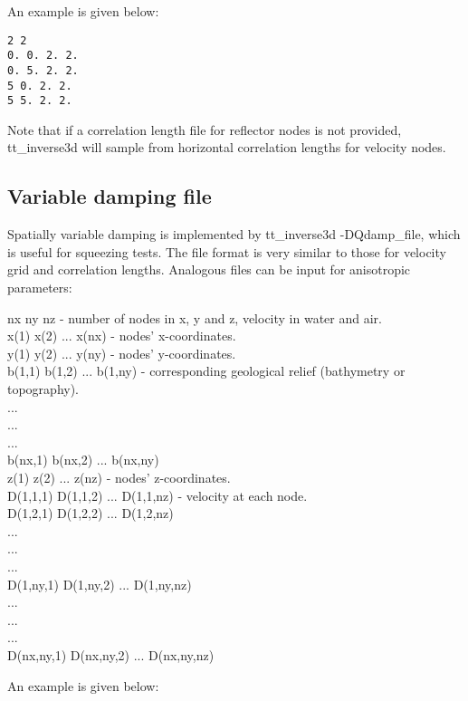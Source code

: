 \documentclass[twoside,final,onecolumn]{article}
\begin{document}
An example is given below:
\begin{verbatim}
2 2
0. 0. 2. 2.
0. 5. 2. 2.
5 0. 2. 2.
5 5. 2. 2.
\end{verbatim}

Note that if a correlation length file for reflector nodes is not provided, tt\_inverse3d will sample from horizontal correlation lengths for velocity nodes.

\subsection{Variable damping file}
Spatially variable damping is implemented by tt\_inverse3d -DQdamp\_file, which is useful for squeezing tests.
The file format is very similar to those for velocity grid and correlation lengths. Analogous files can be input for anisotropic parameters:\\
\begin{framed}
\noindent nx ny nz \qquad\qquad\hphantom{vwater vair}- number of nodes in x, y and z, velocity in water and air.\\
x(1) x(2) ... x(nx) \qquad\qquad\hphantom{no}- nodes' x-coordinates.\\
y(1) y(2) ... y(ny) \qquad\qquad\hphantom{no}- nodes' y-coordinates.\\
b(1,1) b(1,2) ... b(1,ny) \qquad\hphantom{no}- corresponding geological relief (bathymetry or topography).\\
.\hphantom{b(1,1)---}.\hphantom{b(1,2)------}.\\
.\hphantom{b(1,1)---}.\hphantom{b(1,2)------}.\\
.\hphantom{b(1,1)---}.\hphantom{b(1,2)------}.\\
b(nx,1) b(nx,2) ... b(nx,ny)\\
z(1) z(2) ... z(nz) \qquad\qquad\qquad\hphantom{n}- nodes' z-coordinates.\\
D(1,1,1) D(1,1,2) ... D(1,1,nz) \qquad- velocity at each node.\\
D(1,2,1) D(1,2,2) ... D(1,2,nz)\\
.\hphantom{v(1,2,1)---}.\hphantom{v(1,2,2)----}.\\
.\hphantom{v(1,2,1)---}.\hphantom{v(1,2,2)----}.\\
.\hphantom{v(1,2,1)---}.\hphantom{v(1,2,2)----}.\\
D(1,ny,1) D(1,ny,2) ... D(1,ny,nz)\\
.\hphantom{v(1,ny,1)---}.\hphantom{v(1,ny,nz)----}.\\
.\hphantom{v(1,ny,1)---}.\hphantom{v(1,ny,nz)----}.\\
.\hphantom{v(1,ny,1)---}.\hphantom{v(1,ny,nz)----}.\\
D(nx,ny,1) D(nx,ny,2) ... D(nx,ny,nz)
\end{framed}
An example is given below:
\end{document}
